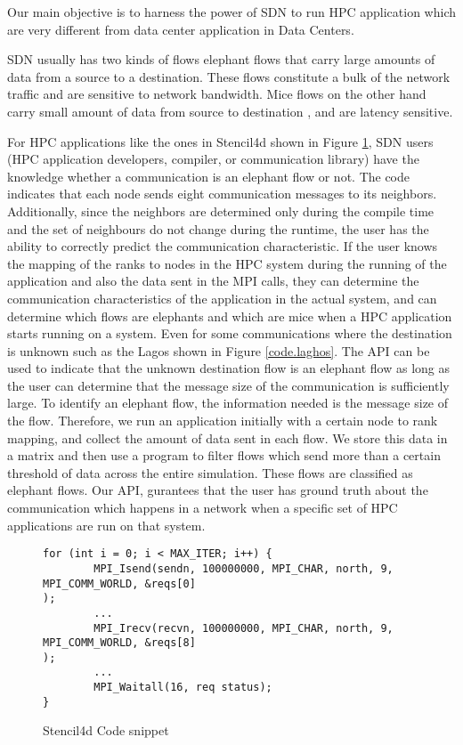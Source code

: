 Our main objective is to harness the power of SDN to run HPC application which are 
very different from data center application in Data Centers.

SDN usually has two kinds of flows elephant flows that
carry large amounts of data from a source to a destination. These flows
constitute a bulk of the network traffic and are sensitive to network bandwidth.
Mice flows on the other hand carry small amount of data from source to
destination \cite{yang2020flow, afek2015sampling}, and are latency sensitive.

For HPC applications like the ones in Stencil4d shown in Figure \ref{code.stencil}, SDN
users (HPC application developers, compiler, or communication library) have the
knowledge whether a communication is an elephant flow or not. The code indicates
that each node sends eight communication messages to its neighbors.
Additionally, since the neighbors are determined only during the compile time
and the set of neighbours do not change during the runtime, the user has the
ability to correctly predict the communication characteristic. If the user knows
the mapping of the ranks to nodes in the HPC system during the running of the
application and also the data sent in the MPI calls, they can determine the
communication characteristics of the application in the actual system, and can
determine which flows are elephants and which are mice when a HPC application
starts running on a system. 
Even for some communications where the
destination is unknown such as the Lagos shown in
Figure \ref{code.laghos}. The API can be used to indicate that the unknown destination flow is
an elephant flow as long as the user can determine that the message size of the
communication is sufficiently large.
To identify an elephant flow, the information needed is the message size of the
flow. Therefore, we run an application initially with a certain node to rank mapping, and collect the
amount of data sent in each flow. We store this data in a matrix and then use a program to filter
flows which send more than a certain threshold of data across the entire simulation. 
These flows are classified as elephant flows. Our API, gurantees that the user has ground truth about
the communication which happens in a network when a specific set of HPC applications are run on that 
system.

\begin{figure}[hbtp]
\caption{Stencil4d Code snippet}
\label{code.stencil}
\begin{lstlisting}[breaklines]
for (int i = 0; i < MAX_ITER; i++) {
        MPI_Isend(sendn, 100000000, MPI_CHAR, north, 9, MPI_COMM_WORLD, &reqs[0]
);
        ...
        MPI_Irecv(recvn, 100000000, MPI_CHAR, north, 9, MPI_COMM_WORLD, &reqs[8]
);
        ...
        MPI_Waitall(16, req status);
}
\end{lstlisting}
\end{figure}



